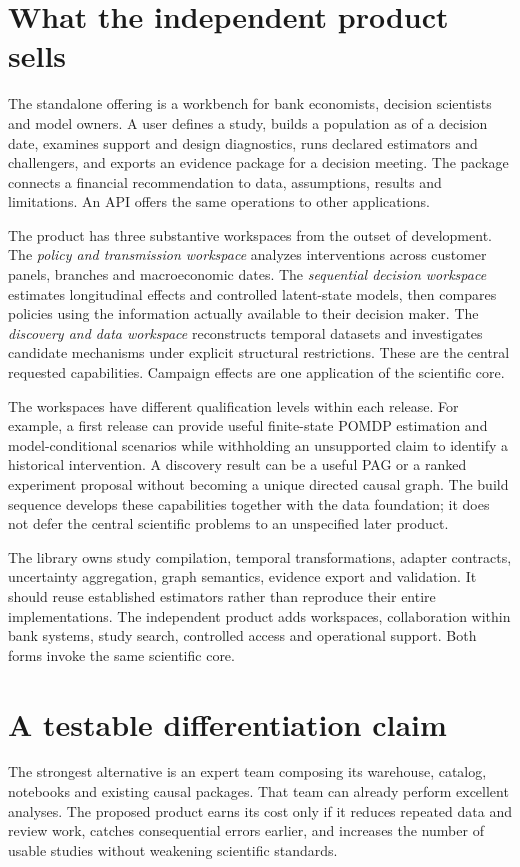 \section{What the independent product sells}
The standalone offering is a workbench for bank economists, decision scientists
and model owners. A user defines a study, builds a population as of a decision
date, examines support and design diagnostics, runs declared estimators and
challengers, and exports an evidence package for a decision meeting. The
package connects a financial recommendation to data, assumptions, results and
limitations. An API offers the same operations to other applications.

The product has three substantive workspaces from the outset of development.
The \emph{policy and transmission workspace} analyzes interventions across
customer panels, branches and macroeconomic dates. The \emph{sequential
decision workspace} estimates longitudinal effects and controlled latent-state
models, then compares policies using the information actually available to
their decision maker. The \emph{discovery and data workspace} reconstructs
temporal datasets and investigates candidate mechanisms under explicit
structural restrictions. These are the central requested capabilities.
Campaign effects are one application of the scientific core.

The workspaces have different qualification levels within each release.
For example, a first release can provide useful finite-state POMDP estimation
and model-conditional scenarios while withholding an unsupported claim to
identify a historical intervention. A discovery result can be a useful PAG
or a ranked experiment proposal without becoming a unique directed causal
graph. The build sequence develops these capabilities together with the
data foundation; it does not defer the central scientific problems to an
unspecified later product.

The library owns study compilation, temporal transformations,
adapter contracts, uncertainty aggregation, graph semantics, evidence export
and validation. It should reuse established estimators rather than reproduce
their entire implementations. The independent product adds workspaces,
collaboration within bank systems, study search, controlled access and
operational support. Both forms invoke the same scientific core.

\section{A testable differentiation claim}
The strongest alternative is an expert team composing its warehouse,
catalog, notebooks and existing causal packages. That team can already perform
excellent analyses. The proposed product earns its cost only if it reduces
repeated data and review work, catches consequential errors earlier, and
increases the number of usable studies without weakening scientific standards.

